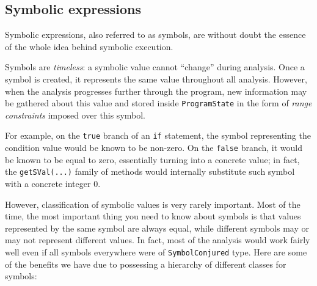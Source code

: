 \documentclass[a4paper,12pt]{article}
\begin{document}
\subsection{Symbolic expressions}\label{subsec:SymExpr}

Symbolic expressions, also referred to as symbols, are without doubt the essence of the whole idea behind symbolic execution.

Symbols are \emph{timeless}: a symbolic value cannot ``change'' during analysis. Once a symbol is created, it represents the same value throughout all analysis. However, when the analysis progresses further through the program, new information may be gathered about this value and stored inside \lstinline|ProgramState| in the form of \emph{range constraints} imposed over this symbol.

For example, on the \lstinline|true| branch of an \lstinline|if| statement, the symbol representing the condition value would be known to be non-zero. On the \lstinline|false| branch, it would be known to be equal to zero, essentially turning into a concrete value; in fact, the \lstinline|getSVal(...)| family of methods would internally substitute such symbol with a concrete integer $0$.

However, classification of symbolic values is very rarely important. Most of the time, the most important thing you need to know about symbols is that values represented by the same symbol are always equal, while different symbols may or may not represent different values. In fact, most of the analysis would work fairly well even if all symbols everywhere were of \lstinline|SymbolConjured| type. Here are some of the benefits we have due to possessing a hierarchy of different classes for symbols:
\end{document}
